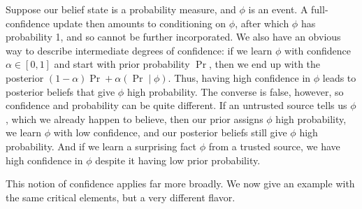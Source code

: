 \documentclass{uai2023}
\theoremstyle{plain}
\theoremstyle{definition}
\newcommand\commentout[1]{}
\begin{document}
\begin{example} \label{ex:prob-simple}
Suppose
our belief state is a probability measure, and $\phi$ is an event. 
A full-confidence update then amounts to conditioning on $\phi$, after which $\phi$ has probability 1, and so cannot be further incorporated.
We also have an obvious way to describe intermediate degrees of confidence:
if we learn $\phi$ with confidence
$\alpha \in [0,1]$
and start with prior probability $\Pr$, then we end up with the
posterior $(1-\alpha)\Pr + \alpha (\Pr\mid \phi)$.
Thus, having high confidence in $\phi$ leads to posterior beliefs that give $\phi$
high
probability.
The converse is false, however, so
confidence and probability can be quite different.
If an untrusted source tells us $\phi$, which we already happen to
believe,  
then our prior assigns $\phi$ high probability,
we learn $\phi$ with low confidence,
and our posterior beliefs still give $\phi$ high probability.  
And
if we learn a surprising fact $\phi$ from a trusted source, we have
high confidence in $\phi$ despite it having low prior probability. 
\end{example}

\commentout{
	In this context, 
	the confidence $\chi \in [0,1]$ has a clear interpretation as the ``fraction of the way towards full incorporation'',
	but in others,
	it may be 
	less clear what a number on this scale (say, $\chi{=}0.7$) means.
}

This notion of confidence applies far more broadly.
We now give an example with the same critical elements,
but a very different flavor.
\end{document}
